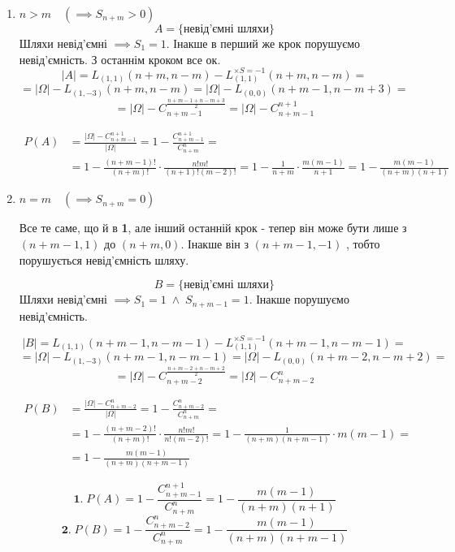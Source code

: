 \begin{enumerate}
	\item $n > m \quad (\implies S_{n+m} > 0)$
	$$A = \{\text{невід'ємні шляхи}\}$$
	Шляхи невід'ємні $\implies S_1 = 1$. 
	Інакше в перший же крок порушуємо невід'ємність.
	З останнім кроком все ок.
	$$|A| = L_{(1,1)}(n+m,n-m) - L^{\times S=-1}_{(1,1)}(n+m,n-m) = $$
	$$= |\Omega| - L_{(1,-3)}(n+m,n-m) = |\Omega| - L_{(0,0)}(n+m-1,n-m+3) = $$
	$$= |\Omega| - C_{n+m-1}^{\frac{n+m-1+n-m+3}{2}} = 
	|\Omega| - C_{n+m-1}^{n+1}$$

	\begin{align*}
		P(A) &= \frac{|\Omega| - C_{n+m-1}^{n+1}}{|\Omega|} = 1 - \frac{C_{n+m-1}^{n+1}}{C_{n+m}^n} = \\
		&= 1 - \frac{(n+m-1)!}{(n+m)!} \cdot \frac{n!m!}{(n+1)!(m-2)!} 
		= 1 - \frac{1}{n+m} \cdot \frac{m(m-1)}{n+1} = 1 - \frac{m(m-1)}{(n+m)(n+1)}
	\end{align*}

	\item $n = m \quad(\implies S_{n+m} = 0)$
	
	Все те саме, що й в \textbf{1}, але інший останній крок - 
	тепер він може бути лише з $(n+m-1, 1)$ до $(n+m,0)$. 
	Інакше він з $(n+m-1, -1)$ , тобто порушується невід'ємність шляху.

	$$B = \{\text{невід'ємні шляхи}\}$$
	Шляхи невід'ємні $\implies S_1 = 1\;\wedge\;S_{n+m-1} = 1$. 
	Інакше порушуємо невід'ємність.
	
	$$|B| = L_{(1,1)}(n+m-1,n-m-1) - L^{\times S=-1}_{(1,1)}(n+m-1,n-m-1) = $$
	$$= |\Omega| - L_{(1,-3)}(n+m-1,n-m-1) = |\Omega| - L_{(0,0)}(n+m-2,n-m+2) = $$
	$$= |\Omega| - C_{n+m-2}^{\frac{n+m-2+n-m+2}{2}} = 
	|\Omega| - C_{n+m-2}^{n}$$

	\begin{align*}
		P(B) &= \frac{|\Omega| - C_{n+m-2}^{n}}{|\Omega|} = 1 - \frac{C_{n+m-2}^{n}}{C_{n+m}^n} = \\
		&= 1 - \frac{(n+m-2)!}{(n+m)!} \cdot \frac{n!m!}{n!(m-2)!} 
		= 1 - \frac{1}{(n+m)(n+m-1)} \cdot m(m-1) =\\
		&= 1 - \frac{m(m-1)}{(n+m)(n+m-1)}
	\end{align*}
\end{enumerate}

\begin{mdframed}[style=ans]
	$$\textbf{1.}\; P(A) = 1 - \frac{C_{n+m-1}^{n+1}}{C_{n+m}^n} = 1 - \frac{m(m-1)}{(n+m)(n+1)}$$
	$$\textbf{2.}\; P(B) = 1 - \frac{C_{n+m-2}^{n}}{C_{n+m}^n} = 1 - \frac{m(m-1)}{(n+m)(n+m-1)}$$
\end{mdframed}

